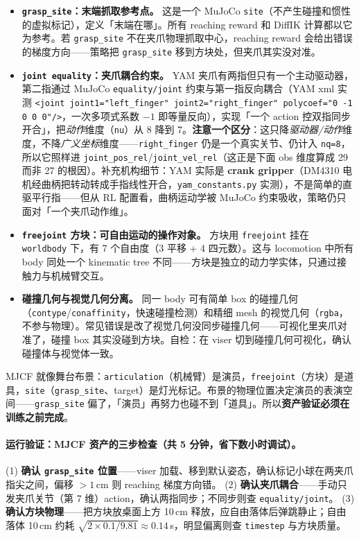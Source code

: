 \begin{itemize}
  \item \textbf{\texttt{grasp\_site}：末端抓取参考点。} 这是一个 MuJoCo \verb|site|（不产生碰撞和惯性的虚拟标记），定义「末端在哪」。所有 reaching reward 和 DiffIK 计算都以它为参考。若 \verb|grasp_site| 不在夹爪物理抓取中心，reaching reward 会给出错误的梯度方向——策略把 \verb|grasp_site| 移到方块处，但夹爪其实没对准。
  \item \textbf{\texttt{joint equality}：夹爪耦合约束。} YAM 夹爪有两指但只有一个主动驱动器，第二指通过 MuJoCo \verb|equality/joint| 约束与第一指反向耦合（YAM xml 实测 \verb|<joint joint1="left_finger" joint2="right_finger" polycoef="0 -1 0 0 0"/>|，一次多项式系数 $-1$ 即等量反向），实现「一个 action 控双指同步开合」，把\emph{动作}维度（\verb|nu|）从 8 降到 7。\textbf{注意一个区分}：这只降\emph{驱动器/动作}维度，不降\emph{广义坐标}维度——\verb|right_finger| 仍是一个真实关节、仍计入 \verb|nq=8|，所以它照样进 \verb|joint_pos_rel|/\verb|joint_vel_rel|（这正是下面 obs 维度算成 29 而非 27 的根因）。补充机构细节：YAM 实际是 \textbf{crank gripper}（DM4310 电机经曲柄把转动转成手指线性开合，\verb|yam_constants.py| 实测），不是简单的直驱平行指——但从 RL 配置看，曲柄运动学被 MuJoCo 约束吸收，策略仍只面对「一个夹爪动作维」。
  \item \textbf{\texttt{freejoint} 方块：可自由运动的操作对象。} 方块用 \verb|freejoint| 挂在 \verb|worldbody| 下，有 7 个自由度（3 平移 + 4 四元数）。这与 locomotion 中所有 body 同处一个 kinematic tree 不同——方块是独立的动力学实体，只通过接触力与机械臂交互。
  \item \textbf{碰撞几何与视觉几何分离。} 同一 body 可有简单 box 的碰撞几何（\verb|contype|/\verb|conaffinity|，快速碰撞检测）和精细 mesh 的视觉几何（\verb|rgba|，不参与物理）。常见错误是改了视觉几何没同步碰撞几何——可视化里夹爪对准了，碰撞 box 其实没碰到方块。自检：在 viser 切到碰撞几何可视化，确认碰撞体与视觉体一致。
\end{itemize}

\begin{note}
MJCF 就像舞台布景：\verb|articulation|（机械臂）是演员，\verb|freejoint|（方块）是道具，\verb|site|（\verb|grasp_site|、target）是灯光标记。布景的物理位置决定演员的表演空间——\verb|grasp_site| 偏了，「演员」再努力也碰不到「道具」。所以\textbf{资产验证必须在训练之前完成}。
\end{note}

\paragraph{运行验证：MJCF 资产的三步检查（共 5 分钟，省下数小时调试）。}
(1) \textbf{确认 \texttt{grasp\_site} 位置}——viser 加载、移到默认姿态，确认标记小球在两夹爪指尖之间，偏移 $>1$\,cm 则 reaching 梯度方向错。
(2) \textbf{确认夹爪耦合}——手动只发夹爪关节（第 7 维）action，确认两指同步；不同步则查 \verb|equality/joint|。
(3) \textbf{确认方块物理}——把方块放桌面上方 10\,cm 释放，应自由落体后弹跳静止；自由落体 10\,cm 约耗 $\sqrt{2\times 0.1/9.81}\approx 0.14$\,s，明显偏离则查 \verb|timestep| 与方块质量。

